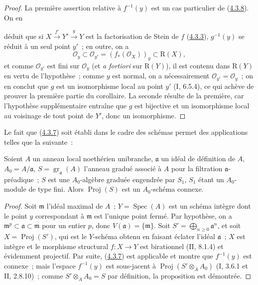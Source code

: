 \begin{proof}
La première assertion relative à $f^{-1}(y)$ est un cas particulier de
(\hyperref[III.4.3.8-fr]{4.3.8}). On en


déduit que si $X\xrightarrow{f'}Y'\xrightarrow{g}Y$ est la factorisation
de Stein de $f$ (\hyperref[III.4.3.3-fr]{4.3.3}), $g^{-1}(y)$ se réduit à
un seul point $y'$~; en outre, on a
\[
\mathcal O_y\subset\mathcal O_{y'}=(f_*(\mathcal O_X))_y
\subset\mathrm R(X),
\]
et comme $\mathcal O_{y'}$ est fini sur $\mathcal O_y$ (et \emph{a
fortiori} sur $\mathrm R(Y)$), il est contenu dans $\mathrm R(Y)$ en vertu
de l'hypothèse~; comme $y$ est normal, on a nécessairement
$\mathcal O_{y'}=\mathcal O_y$~; on en conclut que $g$ est un isomorphisme
local au point $y'$ (I, 6.5.4), ce qui achève de prouver la première partie
du corollaire. La seconde résulte de la première, car l'hypothèse
supplémentaire entraîne que $g$ est bijective et un isomorphisme local au
voisinage de tout point de $Y'$, donc un isomorphisme.
\end{proof}

Le fait que (\hyperref[III.4.3.7-fr]{4.3.7}) soit établi dans le cadre des
schémas permet des applications telles que la suivante~:

\begin{proposition}[4.3.13]
\label{III.4.3.13-fr}
Soient $A$ un anneau local noethérien unibranche, $\mathfrak a$ un idéal de
définition de $A$, $A_0=A/\mathfrak a$,
$S=\operatorname{gr}_{\mathfrak a}(A)$ l'anneau gradué associé à $A$ pour
la filtration $\mathfrak a$-préadique~; $S$ est une $A_0$-algèbre graduée
engendrée par $S_1$, $S_1$ étant un $A_0$-module de type fini. Alors
$\operatorname{Proj}(S)$ est un $A_0$-schéma connexe.
\end{proposition}

\begin{proof}
Soit $\mathfrak m$ l'idéal maximal de $A$~; $Y=\operatorname{Spec}(A)$ est
un schéma intègre dont le point $y$ correspondant à $\mathfrak m$ est
l'unique point fermé. Par hypothèse, on a
$\mathfrak m^p\subset\mathfrak a\subset\mathfrak m$ pour un entier $p$,
donc $V(\mathfrak a)=\{\mathfrak m\}$. Soit
$S'=\bigoplus_{n\geq0}\mathfrak a^n$, et soit
$X=\operatorname{Proj}(S')$, qui est le $Y$-schéma obtenu en faisant éclater
l'idéal $\mathfrak a$~; $X$ est intègre et le morphisme structural
$f:X\to Y$ est birationnel (II, 8.1.4) et évidemment projectif. Par suite,
(\hyperref[III.4.3.7-fr]{4.3.7}) est applicable et montre que $f^{-1}(y)$
est connexe~; mais l'espace $f^{-1}(y)$ est sous-jacent à
$\operatorname{Proj}(S'\otimes_AA_0)$ (I, 3.6.1 et II, 2.8.10)~; comme
$S'\otimes_AA_0=S$ par définition, la proposition est démontrée.
\end{proof}



